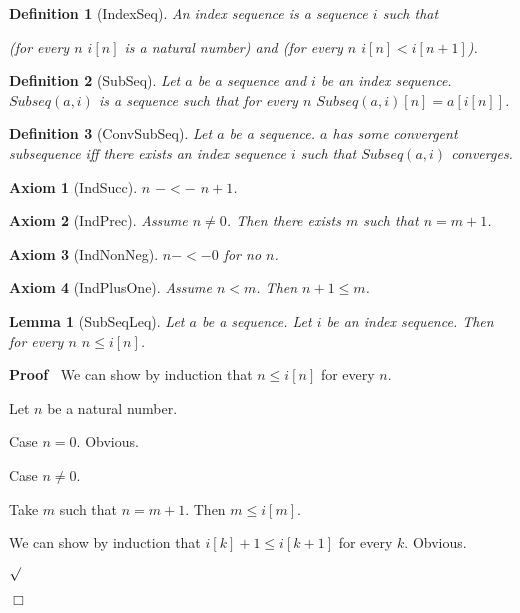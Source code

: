 \documentclass{article}
\newenvironment{forthel}{\begin{leftbar}}{\end{leftbar}}
\newenvironment{proof}{\noindent\textbf{Proof\ }}{\hspace*{\fill}$\Box$\medskip}
\newenvironment{subproof}{\begin{list}{}{}
		\item[\text{Proof}]}{\hfill $\surd$ \end{list}}
\newtheorem{axiom}{Axiom}
\newtheorem{lemma}{Lemma}
\newtheorem{definition}{Definition}
\begin{document}
\begin{forthel}
	
	\begin{definition}[IndexSeq]
		An index sequence is a sequence $i$ such that
		
		(for every $n$ $i[n]$ is a natural number) and (for every $n$ $i[n] < i[n + 1]$).
	\end{definition}
	
	\begin{definition}[SubSeq]
		Let $a$ be a sequence and $i$ be an index sequence. $Subseq(a,i)$ is a sequence such that for every $n$
		$Subseq(a,i)[n] = a[i[n]]$.
	\end{definition}
	
	\begin{definition}[ConvSubSeq]
		Let $a$ be a sequence. $a$ has some convergent subsequence iff there exists an index sequence $i$ such that $Subseq(a,i)$ converges.
	\end{definition}
	
	\begin{axiom}[IndSucc]
		$n$ $-<-$ $n + 1$. 
	\end{axiom}
	
	\begin{axiom}[IndPrec]
		Assume $n \neq 0$. Then there exists $m$ such that $n = m + 1$.
	\end{axiom}
	
	\begin{axiom}[IndNonNeg]
		$n -<- 0$ for no $n$.
	\end{axiom}
	
	\begin{axiom}[IndPlusOne]
		Assume $n < m$. Then $n + 1 \leq m$.
	\end{axiom}
	
	\begin{lemma}[SubSeqLeq]
		Let $a$ be a sequence. Let $i$ be an index sequence. Then for every $n$ $n \leq i[n]$.
	\end{lemma}
	
	\begin{proof}
		We can show by induction that $n \leq i[n]$ for every $n$.
		\begin{subproof}
		Let $n$ be a natural number.
		
		Case $n = 0$. Obvious.
		
		Case $n \neq 0$.
		
		Take $m$ such that $n = m + 1$. Then $m \leq i[m]$. 
		
		We can show by induction that $i[k] + 1 \leq i[k + 1]$ for every $k$. Obvious.
		

\end{subproof}
\end{proof}
\end{forthel}
\end{document}
